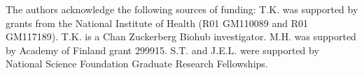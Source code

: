 The authors acknowledge the following sources of funding:
T.K. was supported by grants from the National Institute of Health (R01 GM110089 and R01 GM117189). T.K. is a Chan Zuckerberg Biohub investigator.
M.H. was supported by Academy of Finland grant 299915.
S.T. and J.E.L. were supported by National Science Foundation Graduate Research Fellowships.
